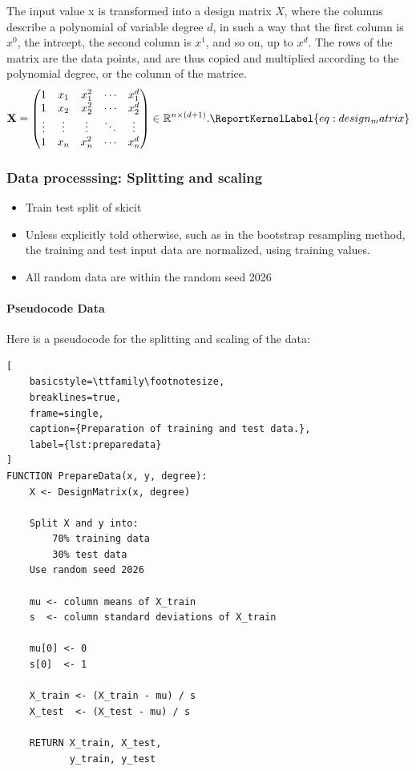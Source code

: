 \documentclass[aps,rmp,reprint,raggedbottom,amsmath,amssymb,longbibliography]{revtex4-1}
\let\label\ReportKernelLabel
\begin{document}
The input value x is transformed into a design matrix $X$,
where the columns describe a polynomial of variable degree $d$,
in such a way that the first column is $x^0$, the intrcept, the second column is $x^1$, and so on, up to $x^{d}$.
The rows of the matrix are the data points, and are thus copied and multiplied according to the polynomial degree, or the column of the matrice.
\begin{equation}
\mathbf{X} =
\begin{pmatrix}
1 & x_1 & x_1^2 & \cdots & x_1^d \\
1 & x_2 & x_2^2 & \cdots & x_2^d \\
\vdots & \vdots & \vdots & \ddots & \vdots \\
1 & x_n & x_n^2 & \cdots & x_n^d
\end{pmatrix}
\in \mathbb{R}^{n \times (d+1)}.
\label{eq:design_matrix}
\end{equation}

\subsubsection{Data processsing: Splitting and scaling}
\begin{itemize}
\item Train test split of skicit
\item Unless explicitly told otherwise, such as in the bootstrap resampling method,
the training and test input data are normalized, using training values.
\item All random data are within the random seed 2026
\end{itemize}

\paragraph{Pseudocode Data}
Here is a pseudocode for the splitting and scaling of the data:
\begin{lstlisting}[
    basicstyle=\ttfamily\footnotesize,
    breaklines=true,
    frame=single,
    caption={Preparation of training and test data.},
    label={lst:preparedata}
]
FUNCTION PrepareData(x, y, degree):
    X <- DesignMatrix(x, degree)

    Split X and y into:
        70% training data
        30% test data
    Use random seed 2026

    mu <- column means of X_train
    s  <- column standard deviations of X_train

    mu[0] <- 0
    s[0]  <- 1

    X_train <- (X_train - mu) / s
    X_test  <- (X_test - mu) / s

    RETURN X_train, X_test,
           y_train, y_test
\end{lstlisting}
\end{document}
